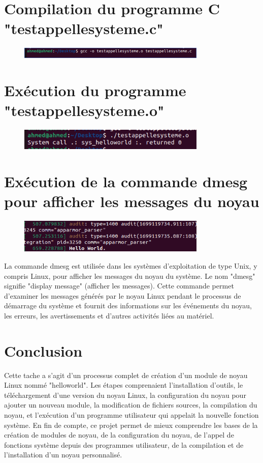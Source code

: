\section{Compilation du programme C "testappellesysteme.c" }
\begin{figure}[h]
    \includegraphics[width=0.8\textwidth]{images/44.png}   
\end{figure}
\section{Exécution du programme "testappellesysteme.o" }
\begin{figure}[h]
    \includegraphics[width=0.8\textwidth]{images/45.png}   
\end{figure}

\section{Exécution de la commande dmesg pour afficher les messages du noyau}
\begin{figure}[h]
    \includegraphics[width=0.8\textwidth]{images/46.png}   
\end{figure}

La commande dmesg est utilisée dans les systèmes d'exploitation de type Unix, y compris Linux, pour afficher les messages du noyau du système. Le nom "dmesg" signifie "display message" (afficher les messages). Cette commande permet d'examiner les messages générés par le noyau Linux pendant le processus de démarrage du système et fournit des informations sur les événements du noyau, les erreurs, les avertissements et d'autres activités liées au matériel.

\section*{Conclusion}
Cette tache a s’agit  d’un processus complet de création d'un module de noyau Linux nommé "helloworld". Les étapes comprenaient l'installation d'outils, le téléchargement d'une version du noyau Linux, la configuration du noyau pour ajouter un nouveau module, la modification de fichiers sources, la compilation du noyau, et l'exécution d'un programme utilisateur qui appelait la nouvelle fonction système. En fin de compte, ce projet  permet de mieux comprendre les bases de la création de modules de noyau, de la configuration du noyau, de l'appel de fonctions système depuis des programmes utilisateur, de la compilation et de l'installation d'un noyau personnalisé.

